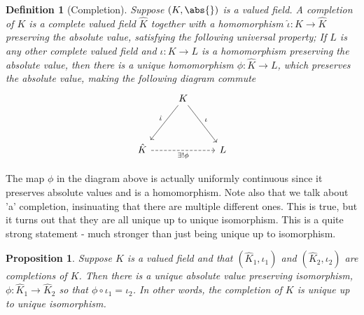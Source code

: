 \documentclass{article}
\newtheorem{definition}{Definition}[section]
\newtheorem{proposition}{Proposition}[section]
\begin{document}
\begin{definition}[Completion]
    Suppose $(K, \abs{})$ is a valued field. A completion of $K$ is a complete valued field $\hat K$ together with a homomorphism $\hat \iota : K \to \hat K$ preserving the absolute value, satisfying the following universal property; If $L$ is any other complete valued field and $\iota : K \to L$ is a homomorphism preserving the absolute value, then there is a unique homomorphism $\phi : \hat K \to L$, which preserves the absolute value, making the following diagram commute
    \[\begin{tikzcd}
        & K \\
        \\
        \hat K && L
        \arrow["{\exists! \phi}"', dashed, from=3-1, to=3-3]
        \arrow["{\hat \iota}"', from=1-2, to=3-1]
	    \arrow["{\iota}", from=1-2, to=3-3]
    \end{tikzcd}\]
\end{definition}
The map $\phi$ in the diagram above is actually uniformly continuous since it preserves absolute values and is a homomorphism. Note also that we talk about 'a' completion, insinuating that there are multiple different ones. This is true, but it turns out that they are all unique up to unique isomorphism. This is a quite strong statement - much stronger than just being unique up to isomorphism. 




\begin{proposition}
    Suppose $K$ is a valued field and that $(\hat K_1, \iota_1)$ and $(\hat K_2, \iota_2)$ are completions of $K$. Then there is a unique absolute value preserving isomorphism, $\phi : \hat K_1 \to \hat K_2$ so that $\phi \circ \iota_1 = \iota_2$. In other words, the completion of $K$ is unique up to unique isomorphism.
\end{proposition}
\end{document}

